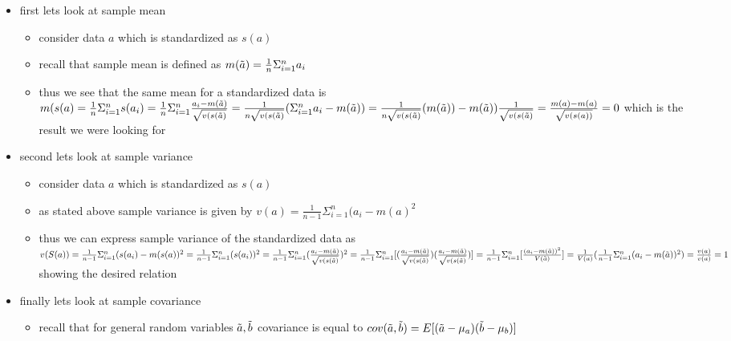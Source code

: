 \documentclass[12pt,twoside]{article}
\begin{document}
\begin{enumerate}
\begin{enumerate}
\begin{itemize}
    \item first lets look at sample mean 
    \begin{itemize}
        \item consider data $a$ which is standardized as $s({a})$
        \item recall that sample mean is defined as $m(\Tilde{a})=\frac{1}{n}\Sigma_{i=1}^{n}a_i$
        \item thus we see that the same mean for a standardized data is $m(s(a)=\frac{1}{n}\Sigma_{i=1}^{n}s(a_i)=\frac{1}{n}\Sigma_{i=1}^{n}\frac{a_i-m(\Tilde{a})}{\sqrt{v(s(\Tilde{a})}}=\frac{1}{n\sqrt{v(s(\Tilde{a})}}(\Sigma_{i=1}^{n}a_i-m(\Tilde{a}))=\frac{1}{n\sqrt{v(s(\Tilde{a})}}(m(\Tilde{a}))-m(\Tilde{a}))\frac{1}{\sqrt{v(s(\Tilde{a})}}=
        \frac{m(a)-m(a)}{\sqrt{v(s(a))}}=0$ which is the result we were looking for 
    \end{itemize} 
    \item second lets look at sample variance
    \begin{itemize}
         \item consider data ${a}$ which is standardized as $s({a})$
         \item as stated above sample variance is given by $v({a})=\frac{1}{n-1}\Sigma_{i=1}^{n}(a_i-m({a})^2$ 
         \item thus we can express sample variance of the standardized data as $v(S({a}))=\frac{1}{n-1}\Sigma_{i=1}^{n}(s(a_i)-m(s({a}))^2=\\\frac{1}{n-1}\Sigma_{i=1}^{n}(s(a_i))^2=\\\frac{1}{n-1}\Sigma_{i=1}^{n}(\frac{a_i-m(\Tilde{a})}{\sqrt{v(s(\Tilde{a})}})^2\\=\frac{1}{n-1}\Sigma_{i=1}^{n}[(\frac{a_i-m(\Tilde{a})}{\sqrt{v(s(\Tilde{a})}})(\frac{a_i-m(\Tilde{a})}{\sqrt{v(s(\Tilde{a})}})]=\\\frac{1}{n-1}\Sigma_{i=1}^{n}[\frac{(a_i-m(\Tilde{a}))^2}{V(\Tilde{a})}]=\\\frac{1}{V(a)}(\frac{1}{n-1}\Sigma_{i=1}^{n}(a_i-m(\Tilde{a}))^2)=\\\\ \frac{v({a})}{v({a})}\\=1$ showing the desired relation
    \end{itemize}
    \item finally lets look at sample covariance
    \begin{itemize}
        \item recall that for general random variables $\Tilde{a}, \Tilde{b}$ covariance is equal to $cov(\Tilde{a},\Tilde{b})=E[(\Tilde{a}-\mu_{a})(\Tilde{b}-\mu_{b})]$

\end{itemize}
\end{itemize}
\end{enumerate}
\end{enumerate}
\end{document}
